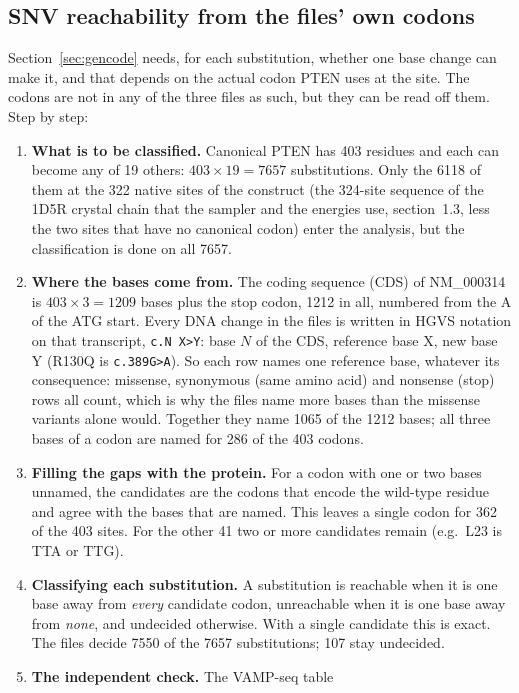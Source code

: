 \documentclass[11pt,a4paper]{article}
\begin{document}
\subsection{SNV reachability from the files' own codons}\label{sec:snv}

Section~\ref{sec:gencode} needs, for each substitution, whether one base change
can make it, and that depends on the actual codon PTEN uses at the site. The
codons are not in any of the three files as such, but they can be read off
them. Step by step:
\begin{enumerate}
\item \textbf{What is to be classified.} Canonical PTEN has 403 residues and
  each can become any of 19 others: $403\times19 = 7657$ substitutions. Only
  the 6118 of them at the 322 native sites of the construct (the 324-site
  sequence of the 1D5R crystal chain that the sampler and the energies use,
  section~1.3, less the two sites that have no canonical codon) enter the
  analysis, but the classification is done on all 7657.
\item \textbf{Where the bases come from.} The coding sequence (CDS) of
  NM\_000314 is $403\times3 = 1209$ bases plus the stop codon, 1212 in all,
  numbered from the A of the ATG start. Every DNA change in the files is
  written in HGVS notation on that transcript, \texttt{c.N X>Y}: base $N$ of
  the CDS, reference base X, new base Y (R130Q is \texttt{c.389G>A}). So each
  row names one reference base, whatever its consequence: missense,
  synonymous (same amino acid) and nonsense (stop) rows all count, which is
  why the files name more bases than the missense variants alone would.
  Together they name 1065 of the 1212 bases; all three bases of a codon are
  named for 286 of the 403 codons.
\item \textbf{Filling the gaps with the protein.} For a codon with one or two
  bases unnamed, the candidates are the codons that encode the wild-type
  residue and agree with the bases that are named. This leaves a single codon
  for 362 of the 403 sites. For the other 41 two or more candidates remain
  (e.g.\ L23 is TTA or TTG).
\item \textbf{Classifying each substitution.} A substitution is reachable when
  it is one base away from \emph{every} candidate codon, unreachable when it
  is one base away from \emph{none}, and undecided otherwise. With a single
  candidate this is exact. The files decide 7550 of the 7657 substitutions;
  107 stay undecided.
\item \textbf{The independent check.} The VAMP-seq table

\end{enumerate}
\end{document}
